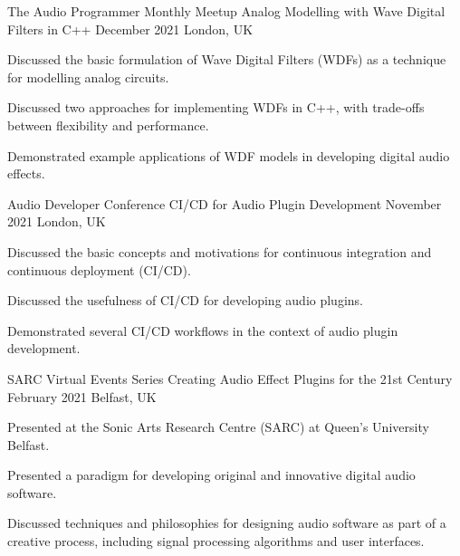 \begin{cventries}
  \cventry
    {The Audio Programmer Monthly Meetup} %
    {Analog Modelling with Wave Digital Filters in C++} %
    {December 2021} %
    {London, UK} %
    {
      \begin{cvitems} %
        \item {Discussed the basic formulation of Wave Digital Filters (WDFs) as a technique for modelling analog circuits.}
        \item {Discussed two approaches for implementing WDFs in C++, with trade-offs between flexibility and performance.}
        \item {Demonstrated example applications of WDF models in developing digital audio effects.}
      \end{cvitems}
    }

  \cventry
    {Audio Developer Conference} %
    {CI/CD for Audio Plugin Development} %
    {November 2021} %
    {London, UK} %
    {
      \begin{cvitems} %
        \item {Discussed the basic concepts and motivations for continuous integration and continuous deployment (CI/CD).}
        \item {Discussed the usefulness of CI/CD for developing audio plugins.}
        \item {Demonstrated several CI/CD workflows in the context of audio plugin development.}
      \end{cvitems}
    }

  \cventry
    {SARC Virtual Events Series} %
    {Creating Audio Effect Plugins for the 21st Century} %
    {February 2021} %
    {Belfast, UK} %
    {
      \begin{cvitems} %
        \item {Presented at the Sonic Arts Research Centre (SARC) at Queen's University Belfast.}
        \item {Presented a paradigm for developing original and innovative digital audio software.}
        \item {Discussed techniques and philosophies for designing audio software as part of a creative process,
               including signal processing algorithms and user interfaces.}
      \end{cvitems}
    }


\end{cventries}
